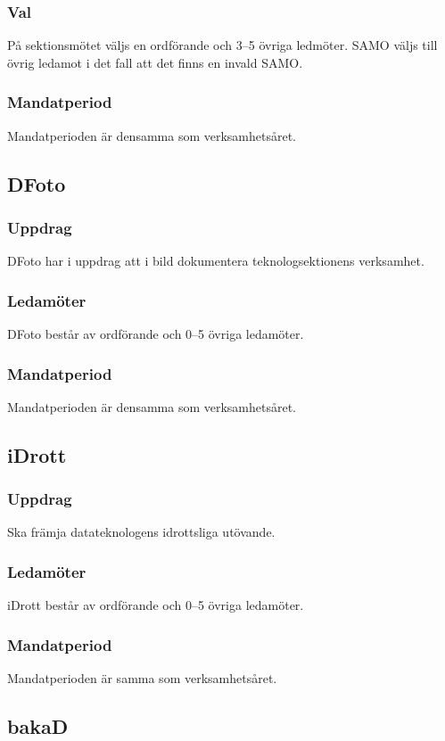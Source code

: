 \subsubsection{Val}
På sektionsmötet väljs en ordförande och 3--5 övriga ledmöter. 
SAMO väljs till övrig ledamot i det fall att det finns en invald SAMO. 
\subsubsection{Mandatperiod}
Mandatperioden är densamma som verksamhetsåret.

\subsection{DFoto}
\subsubsection{Uppdrag}
DFoto har i uppdrag att i bild dokumentera teknologsektionens verksamhet.
\subsubsection{Ledamöter}
DFoto består av ordförande och 0--5 övriga ledamöter.
\subsubsection{Mandatperiod}
Mandatperioden är densamma som verksamhetsåret.

\subsection{iDrott}
\subsubsection{Uppdrag}
Ska främja datateknologens idrottsliga utövande. 
\subsubsection{Ledamöter}
iDrott består av ordförande och 0--5 övriga ledamöter. 
\subsubsection{Mandatperiod}
Mandatperioden är samma som verksamhetsåret. 

\subsection{bakaD}

